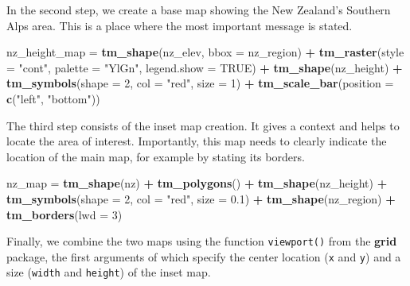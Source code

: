 \documentclass[]{krantz}
\newenvironment{Shaded}{\begin{snugshade}}{\end{snugshade}}
\newcommand{\DataTypeTok}[1]{\textcolor[rgb]{0.27,0.27,0.27}{#1}}
\newcommand{\DecValTok}[1]{\textcolor[rgb]{0.06,0.06,0.06}{#1}}
\newcommand{\FloatTok}[1]{\textcolor[rgb]{0.06,0.06,0.06}{#1}}
\newcommand{\KeywordTok}[1]{\textcolor[rgb]{0.27,0.27,0.27}{\textbf{#1}}}
\newcommand{\NormalTok}[1]{#1}
\newcommand{\OperatorTok}[1]{\textcolor[rgb]{0.43,0.43,0.43}{\textbf{#1}}}
\newcommand{\OtherTok}[1]{\textcolor[rgb]{0.37,0.37,0.37}{#1}}
\newcommand{\StringTok}[1]{\textcolor[rgb]{0.5,0.5,0.5}{#1}}
\begin{document}
In the second step, we create a base map showing the New Zealand's Southern Alps area.
This is a place where the most important message is stated.

\begin{Shaded}
\begin{Highlighting}[]
\NormalTok{nz_height_map =}\StringTok{ }\KeywordTok{tm_shape}\NormalTok{(nz_elev, }\DataTypeTok{bbox =}\NormalTok{ nz_region) }\OperatorTok{+}
\StringTok{  }\KeywordTok{tm_raster}\NormalTok{(}\DataTypeTok{style =} \StringTok{"cont"}\NormalTok{, }\DataTypeTok{palette =} \StringTok{"YlGn"}\NormalTok{, }\DataTypeTok{legend.show =} \OtherTok{TRUE}\NormalTok{) }\OperatorTok{+}
\StringTok{  }\KeywordTok{tm_shape}\NormalTok{(nz_height) }\OperatorTok{+}\StringTok{ }\KeywordTok{tm_symbols}\NormalTok{(}\DataTypeTok{shape =} \DecValTok{2}\NormalTok{, }\DataTypeTok{col =} \StringTok{"red"}\NormalTok{, }\DataTypeTok{size =} \DecValTok{1}\NormalTok{) }\OperatorTok{+}
\StringTok{  }\KeywordTok{tm_scale_bar}\NormalTok{(}\DataTypeTok{position =} \KeywordTok{c}\NormalTok{(}\StringTok{"left"}\NormalTok{, }\StringTok{"bottom"}\NormalTok{))}
\end{Highlighting}
\end{Shaded}

The third step consists of the inset map creation.
It gives a context and helps to locate the area of interest.
Importantly, this map needs to clearly indicate the location of the main map, for example by stating its borders.

\begin{Shaded}
\begin{Highlighting}[]
\NormalTok{nz_map =}\StringTok{ }\KeywordTok{tm_shape}\NormalTok{(nz) }\OperatorTok{+}\StringTok{ }\KeywordTok{tm_polygons}\NormalTok{() }\OperatorTok{+}
\StringTok{  }\KeywordTok{tm_shape}\NormalTok{(nz_height) }\OperatorTok{+}\StringTok{ }\KeywordTok{tm_symbols}\NormalTok{(}\DataTypeTok{shape =} \DecValTok{2}\NormalTok{, }\DataTypeTok{col =} \StringTok{"red"}\NormalTok{, }\DataTypeTok{size =} \FloatTok{0.1}\NormalTok{) }\OperatorTok{+}\StringTok{ }
\StringTok{  }\KeywordTok{tm_shape}\NormalTok{(nz_region) }\OperatorTok{+}\StringTok{ }\KeywordTok{tm_borders}\NormalTok{(}\DataTypeTok{lwd =} \DecValTok{3}\NormalTok{) }
\end{Highlighting}
\end{Shaded}

Finally, we combine the two maps using the function \texttt{viewport()} from the \textbf{grid} package, the first arguments of which specify the center location (\texttt{x} and \texttt{y}) and a size (\texttt{width} and \texttt{height}) of the inset map.
\end{document}
